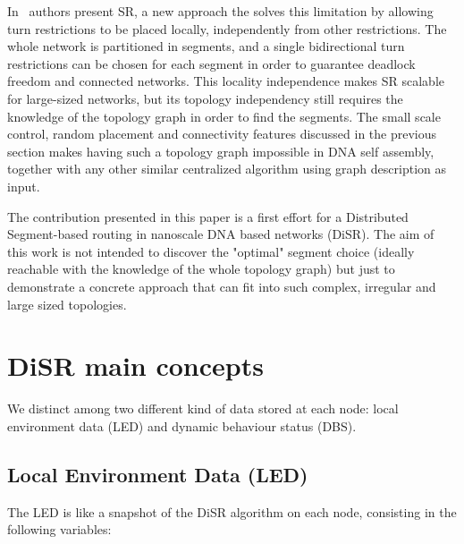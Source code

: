 \documentclass[final,journal,letterpaper]{IEEEtran}
\begin{document}
In~\cite{} authors present SR, a new approach the solves this limitation by
allowing turn restrictions to be placed locally, independently from
other restrictions. The whole network is partitioned in segments, and a
single bidirectional turn restrictions can be chosen for each
segment in order to guarantee deadlock freedom and connected networks.
This locality independence makes SR scalable for large-sized networks,
but its topology independency still requires the knowledge of the
topology graph in order to find the segments. The small scale control,
random placement and connectivity features discussed in the previous
section makes having such a topology graph impossible in DNA
self assembly, together with any other similar centralized algorithm using
graph description as input.

The contribution presented in this paper is a first effort for a
Distributed Segment-based routing in nanoscale DNA based networks
(DiSR). The aim of this work is not intended to discover the "optimal"
segment choice (ideally reachable with the knowledge of the whole
topology graph) but just to demonstrate a concrete approach that can fit
into such complex, irregular and large sized topologies.

\section{DiSR main concepts}

We distinct among two different kind of data stored at each node:
local environment data (LED) and dynamic behaviour status (DBS).

\subsection{Local Environment Data (LED)}

The LED is like a snapshot of the DiSR algorithm on each node,
consisting in the following variables:
\end{document}
